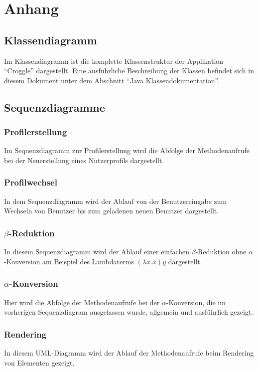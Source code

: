 \chapter{Anhang}
\section{Klassendiagramm}
	Im Klassendiagramm ist die komplette Klassenstruktur der Applikation "`Croggle"' dargestellt. 
	Eine ausführliche Beschreibung der Klassen befindet sich in diesem Dokument unter dem Abschnitt "`Java Klassendokumentation"'. 

\section{Sequenzdiagramme}
	\subsection{Profilerstellung}
		Im Sequenzdiagramm zur Profilerstellung wird die Abfolge der Methodenaufrufe bei der Neuerstellung eines Nutzerprofils dargestellt.

	\subsection{Profilwechsel}
		In dem Sequenzdiagramm wird der Ablauf von der Benutzereingabe zum Wechseln von Benutzer bis zum geladenen neuen Benutzer dargestellt. 

	\subsection{\(\beta\)-Reduktion}
		In diesem Sequenzdiagramm wird der Ablauf einer einfachen \(\beta\)-Reduktion ohne \(\alpha\)-Konversion am Beispiel des Lambdaterms \((\lambda x.x) y\) dargestellt.

	\subsection{\(\alpha\)-Konversion}
		Hier wird die Abfolge der Methodenaufrufe bei der \(\alpha\)-Konversion, die im vorherigen Sequenzdiagram ausgelassen wurde, allgemein und ausführlich gezeigt.  

	\subsection{Rendering}
		In diesem UML-Diagramm wird der Ablauf der Methodenaufrufe beim Rendering von Elementen gezeigt.
